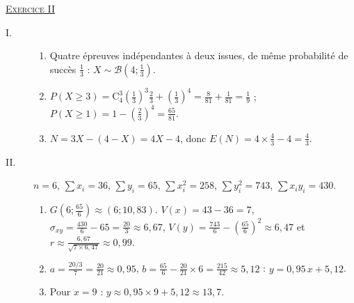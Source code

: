\begin{corrige}
\noindent \underline{\textsc{Exercice II}}
\begin{description}
\item[I.] \begin{enumerate}
      \item Quatre \'epreuves ind\'ependantes \`a deux issues, de m\^eme probabilit\'e de succ\`es $\frac{1}{3}$ : $X \sim \mathscr{B}\left(4 ; \frac{1}{3}\right)$.
      \item $P(X \geq 3) = \mathrm{C}_4^3\left(\frac{1}{3}\right)^3\frac{2}{3} + \left(\frac{1}{3}\right)^4 = \frac{8}{81} + \frac{1}{81} = \frac{1}{9}$ ;
            $P(X \geq 1) = 1 - \left(\frac{2}{3}\right)^4 = \frac{65}{81}$.
      \item $N = 3X - (4 - X) = 4X - 4$, donc $E(N) = 4 \times \frac{4}{3} - 4 = \frac{4}{3}$.
      \end{enumerate}
\item[II.] $n = 6$, $\sum x_i = 36$, $\sum y_i = 65$, $\sum x_i^2 = 258$, $\sum y_i^2 = 743$, $\sum x_i y_i = 430$.
      \begin{enumerate}
      \item $G\left(6 ; \frac{65}{6}\right) \approx (6 ; 10{,}83)$. $V(x) = 43 - 36 = 7$, $\sigma_{xy} = \frac{430}{6} - 65 = \frac{20}{3} \approx 6{,}67$,
            $V(y) = \frac{743}{6} - \left(\frac{65}{6}\right)^2 \approx 6{,}47$ et $r \approx \frac{6{,}67}{\sqrt{7 \times 6{,}47}} \approx 0{,}99$.
      \item $a = \frac{20/3}{7} = \frac{20}{21} \approx 0{,}95$, $b = \frac{65}{6} - \frac{20}{21} \times 6 = \frac{215}{42} \approx 5{,}12$ :
            $y = 0{,}95\,x + 5{,}12$.
      \item Pour $x = 9$ : $y \approx 0{,}95 \times 9 + 5{,}12 \approx 13{,}7$.
      \end{enumerate}
\end{description}


\end{corrige}
